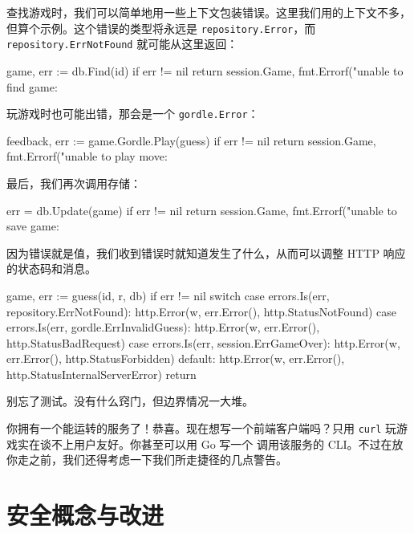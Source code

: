 查找游戏时，我们可以简单地用一些上下文包装错误。这里我们用的上下文不多，但算个示例。这个错误的类型将永远是 \texttt{repository.Error}，而 \texttt{repository.ErrNotFound} 就可能从这里返回：

\begin{gocode}[]
game, err := db.Find(id)
if err != nil {
    return session.Game{}, fmt.Errorf("unable to find game: %
}
\end{gocode}

玩游戏时也可能出错，那会是一个 \texttt{gordle.Error}：

\begin{gocode}[]
feedback, err := game.Gordle.Play(guess)
if err != nil {
    return session.Game{}, fmt.Errorf("unable to play move: %
}
\end{gocode}

最后，我们再次调用存储：

\begin{gocode}[]
err = db.Update(game)
if err != nil {
    return session.Game{}, fmt.Errorf("unable to save game: %
}
\end{gocode}

因为错误就是值，我们收到错误时就知道发生了什么，从而可以调整 HTTP 响应的状态码和消息。

\begin{gocode}[title={代码清单 8.41 \texttt{guess/handler.go}：使用 \texttt{domain.Game}}]
game, err := guess(id, r, db)
if err != nil {
    switch {
    case errors.Is(err, repository.ErrNotFound):
        http.Error(w, err.Error(), http.StatusNotFound)
    case errors.Is(err, gordle.ErrInvalidGuess):
        http.Error(w, err.Error(), http.StatusBadRequest)
    case errors.Is(err, session.ErrGameOver):
        http.Error(w, err.Error(), http.StatusForbidden)
    default:
        http.Error(w, err.Error(), http.StatusInternalServerError)
    }
    return
}
\end{gocode}

别忘了测试。没有什么窍门，但边界情况一大堆。

你拥有一个能运转的服务了！恭喜。现在想写一个前端客户端吗？只用 \texttt{curl} 玩游戏实在谈不上用户友好。你甚至可以用 Go 写一个
调用该服务的 CLI。不过在放你走之前，我们还得考虑一下我们所走捷径的几点警告。

\section{安全概念与改进}

